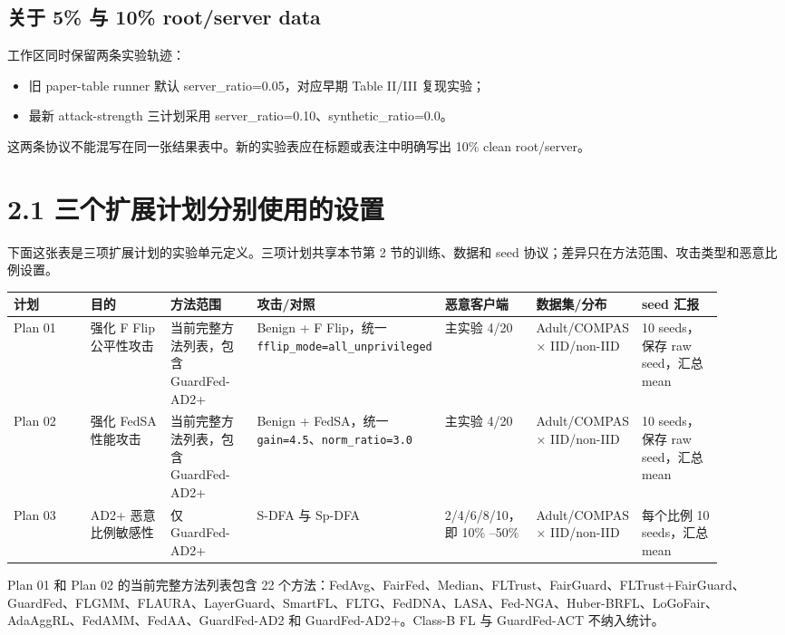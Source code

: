 \documentclass[UTF8,a4paper,10pt]{ctexart}
\begin{document}
\subsection{关于 5\%  与 10\%  root/server data}
工作区同时保留两条实验轨迹：

\begin{itemize}
\item 旧 paper-table runner 默认 server\_ratio=0.05，对应早期 Table II/III 复现实验；
\item 最新 attack-strength 三计划采用 server\_ratio=0.10、synthetic\_ratio=0.0。
\end{itemize}
这两条协议不能混写在同一张结果表中。新的实验表应在标题或表注中明确写出 10\%  clean root/server。

\section{2.1 三个扩展计划分别使用的设置}
下面这张表是三项扩展计划的实验单元定义。三项计划共享本节第 2 节的训练、数据和 seed 协议；差异只在方法范围、攻击类型和恶意比例设置。

{\scriptsize
\renewcommand{\arraystretch}{1.18}
\begin{longtable}{|p{0.130\linewidth}|p{0.130\linewidth}|p{0.130\linewidth}|p{0.130\linewidth}|p{0.130\linewidth}|p{0.130\linewidth}|p{0.130\linewidth}|}
\hline
计划 & 目的 & 方法范围 & 攻击/对照 & 恶意客户端 & 数据集/分布 & seed 汇报 \\\hline
\endhead
Plan 01 & 强化 F Flip 公平性攻击 & 当前完整方法列表，包含 GuardFed-AD2+ & Benign + F Flip，统一 \texttt{fflip\_mode=all\_unprivileged} & 主实验 4/20 & Adult/COMPAS × IID/non-IID & 10 seeds，保存 raw seed，汇总 mean \\\hline
Plan 02 & 强化 FedSA 性能攻击 & 当前完整方法列表，包含 GuardFed-AD2+ & Benign + FedSA，统一 \texttt{gain=4.5}、\texttt{norm\_ratio=3.0} & 主实验 4/20 & Adult/COMPAS × IID/non-IID & 10 seeds，保存 raw seed，汇总 mean \\\hline
Plan 03 & AD2+ 恶意比例敏感性 & 仅 GuardFed-AD2+ & S-DFA 与 Sp-DFA & 2/4/6/8/10，即 10\% --50\%  & Adult/COMPAS × IID/non-IID & 每个比例 10 seeds，汇总 mean \\\hline
\end{longtable}
}
Plan 01 和 Plan 02 的当前完整方法列表包含 22 个方法：FedAvg、FairFed、Median、FLTrust、FairGuard、FLTrust+FairGuard、GuardFed、FLGMM、FLAURA、LayerGuard、SmartFL、FLTG、FedDNA、LASA、Fed-NGA、Huber-BRFL、LoGoFair、AdaAggRL、FedAMM、FedAA、GuardFed-AD2 和 GuardFed-AD2+。Class-B FL 与 GuardFed-ACT 不纳入统计。
\end{document}
